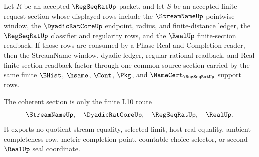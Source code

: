 \begin{theorem}
\label{thm:regseqrat-stream-dyadic-real-section-coherence}
Let $R$ be an accepted $\RegSeqRatUp$ packet, and let $S$ be an accepted finite
request section whose displayed rows include the $\StreamNameUp$ pointwise
window, the $\DyadicRatCoreUp$ endpoint, radius, and finite-distance ledger,
the $\RegSeqRatUp$ classifier and regularity rows, and the $\RealUp$
finite-section readback. If those rows are consumed by a Phase Real and
Completion reader, then the StreamName window, dyadic ledger, regular-rational
readback, and Real finite-section readback factor through one common source
section carried by the same finite $\BHist$, $\hsame$, $\Cont$, $\Pkg$, and
$\NameCert_{\RegSeqRatUp}$ support rows.

The coherent section is only the finite L10 route
$$
\StreamNameUp,\quad \DyadicRatCoreUp,\quad \RegSeqRatUp,\quad \RealUp.
$$
It exports no quotient stream equality, selected limit, host real equality,
ambient completeness row, metric-completion point, countable-choice selector,
or second $\RealUp$ seal coordinate.
\end{theorem}

